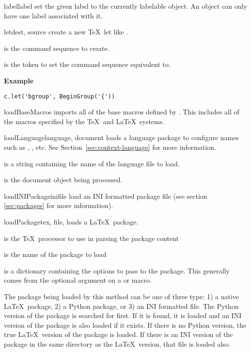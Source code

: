 \begin{methoddesc}[Context]{label}{label}
set the given label to the currently labelable object.  An object can
only have one label associated with it.
\end{methoddesc}

\begin{methoddesc}[Context]{let}{dest, source}
create a new \TeX\ let like .

 is the command sequence to create.

 is the token to set the command sequence equivalent to.

\textbf{Example}
\begin{verbatim}
c.let('bgroup', BeginGroup('{'))
\end{verbatim}
\end{methoddesc}

\begin{methoddesc}[Context]{loadBaseMacros}{}
imports all of the base macros defined by \plasTeX.  This includes all of
the macros specified by the \TeX\ and \LaTeX\ systems.
\end{methoddesc}

\begin{methoddesc}[Context]{loadLanguage}{language, document}
loads a language package to configure names such as ,
, etc. See Section~\ref{sec:context-language} for more
information.

 is a string containing the name of the language file to load.

 is the document object being processed.
\end{methoddesc}

\begin{methoddesc}[Context]{loadINIPackage}{inifile}
load an INI formatted package file (see section \ref{sec:packages} for
more information).
\end{methoddesc}

\begin{methoddesc}[Context]{loadPackage}{tex, file, }
loads a \LaTeX\ package.

 is the \TeX\ processor to use in parsing the package content

 is the name of the package to load

 is a dictionary containing the options to pass to the package.
This generally comes from the optional argument on a 
or  macro.

The package being loaded by this method can be one of three type: 1)
a native \LaTeX\ package, 2) a Python package, or 3) an INI formatted file.
The Python version of the package is searched for first.  If it is found,
it is loaded and an INI version of the package is also loaded if it
exists.  If there is no Python version, the true \LaTeX\ version of the
package is loaded.  If there is an INI version of the package in the same
directory as the \LaTeX\ version, that file is loaded also.
\end{methoddesc}

